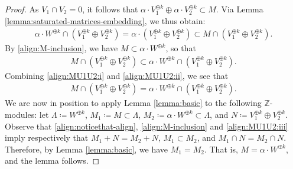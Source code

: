 \documentclass[a4paper,11pt,reqno]{amsart}
\numberwithin{equation}{section}
\theoremstyle{plain}
\theoremstyle{definition}
\newcommand{\Z}{\mathbb Z}
\begin{document}
\begin{proof}
As $V_1 \cap V_2 = 0$, it follows that $\alpha\cdot V_1^{\oplus k} \oplus \alpha \cdot V_2^{\oplus k} \subset M$. Via Lemma \ref{lemma:saturated-matrices-embedding}, we thus obtain:
\begin{align}
    \label{align:MU1U2:i}
\alpha \cdot W^{\oplus k} \cap \left(V_1^{\oplus k} \oplus V_2^{\oplus k} \right) =
\alpha \cdot \left(V_1^{\oplus k} \oplus V_2^{\oplus k} \right)   
\subset M \cap \left(V_1^{\oplus k} \oplus V_2^{\oplus k} \right). 
\end{align}
By \eqref{align:M-inclusion}, we have $M \subset \alpha \cdot W^{\oplus k}$, so that 
\begin{align}
\label{align:MU1U2:ii}
M \cap \left(V_1^{\oplus k} \oplus V_2^{\oplus k} \right) \subset \alpha \cdot W^{\oplus k} \cap \left(V_1^{\oplus k} \oplus V_2^{\oplus k} \right).
\end{align}
Combining \eqref{align:MU1U2:i} and \eqref{align:MU1U2:ii}, we see that
\begin{align}
\label{align:MU1U2:iii}
M \cap \left(V_1^{\oplus k} \oplus V_2^{\oplus k} \right) = 
\alpha \cdot W^{\oplus k} \cap \left( V_1^{\oplus k} \oplus V_2^{\oplus k} \right). 
\end{align}
We are now in position to apply Lemma \ref{lemma:basic} to the following $\Z$-modules: let $\Lambda \coloneqq W^{\oplus k}$, $M_1 \coloneqq M \subset \Lambda$, $M_2 \coloneqq \alpha \cdot W^{\oplus k} \subset \Lambda$, and $N \coloneqq V_1^{\oplus k} \oplus V_2^{\oplus k}$. Observe that \eqref{align:noticethat-align}, \eqref{align:M-inclusion} and \eqref{align:MU1U2:iii} imply respectively that $M_1 + N = M_2 + N$, $M_1 \subset M_2$, and $M_1 \cap N = M_2 \cap N$. Therefore, by Lemma \ref{lemma:basic}, we have $M_1 = M_2$. That is, $
M = \alpha \cdot W^{\oplus k}$, and the lemma follows. 
\end{proof}
\end{document}
